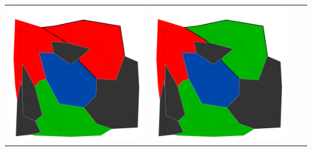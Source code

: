 \documentclass[10pt,a4paper]{article}
\begin{document}
\begin{tabular}{c c c c }
	\includegraphics[scale=.10]{../results/backtracking_simple/map_build/bt_simple_I00007.pdf}&
	\includegraphics[scale=.10]{../results/backtracking_simple/map_build/bt_simple_I00008.pdf}\\
	

\end{tabular}
\end{document}
